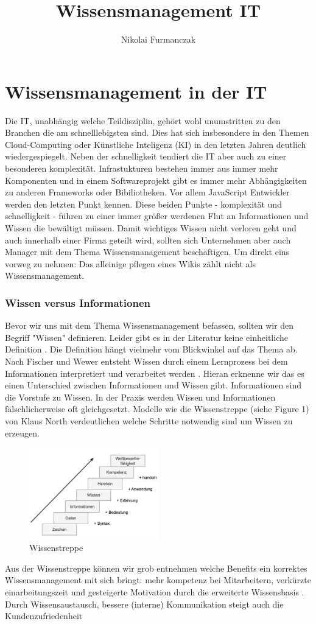 \documentclass{article}
\title{Wissensmanagement IT}
\author{Nikolai Furmanczak}
\begin{document}
\section*{Wissensmanagement in der IT}
Die IT, unabhängig welche Teildisziplin, gehört wohl unumstritten zu den Branchen die am schnelllebigsten sind. Dies hat sich insbesondere in den Themen Cloud-Computing oder Künstliche Inteligenz (KI) in den letzten Jahren deutlich wiedergespiegelt. Neben der schnelligkeit tendiert die IT aber auch zu einer besonderen komplexität. Infrastukturen bestehen immer aus immer mehr Komponenten und in einem Softwareprojekt gibt es immer mehr Abhängigkeiten zu anderen Frameworks oder Bibiliotheken. Vor allem JavaScript Entwickler werden den letzten Punkt kennen. Diese beiden Punkte - komplexität und schnelligkeit - führen zu einer immer größer werdenen Flut an Informationen und Wissen die  bewältigt müssen. Damit wichtiges Wissen nicht verloren geht und auch innerhalb einer Firma geteilt wird, sollten sich Unternehmen aber auch Manager mit dem Thema Wissensmanagement beschäftigen. Um direkt eins vorweg zu nehmen: Das alleinige pflegen eines Wikis zählt nicht als Wissensmanagement.
\subsubsection*{Wissen versus Informationen}
Bevor wir uns mit dem Thema Wissensmanagement befassen, sollten wir den Begriff "Wissen" definieren. Leider gibt es in der Literatur keine einheitliche Definition \parencite{ReinmannRothmeierMandl2000}. Die Definition hängt vielmehr vom Blickwinkel auf das Thema ab. Nach Fischer und Wewer entsteht Wissen durch einem Lernprozess bei dem Informationen interpretiert und verarbeitet werden \parencite*[p. 2]{FischerWewer2021}. Hieran erknenne wir das es einen Unterschied zwischen Informationen und Wissen gibt. Informationen sind die Vorstufe zu Wissen. In der Praxis werden Wissen und Informationen fälschlicherweise oft gleichgesetzt. Modelle wie die Wissenstreppe (siehe Figure 1) von Klaus North verdeutlichen welche Schritte notwendig sind um Wissen zu erzeugen.   
\begin{figure}
    \centering
    \includegraphics[width=0.5\textwidth]{images/wissenstreppe.png}
    \caption{Wissenstreppe}
    \label{fig:meinBild}
  \end{figure}
Aus der Wissenstreppe können wir grob entnehmen welche Benefits ein korrektes Wissensmanagement mit sich bringt: mehr kompetenz bei Mitarbeitern, verkürzte einarbeitungszeit und gesteigerte Motivation durch die erweiterte Wissensbasis \parencite{NorthSchmidt2004}. Durch Wissensaustausch, bessere (interne) Kommunikation steigt auch die Kundenzufriedenheit \parencite{NorthSchmidt2004}
  \printbibliography
\end{document}
